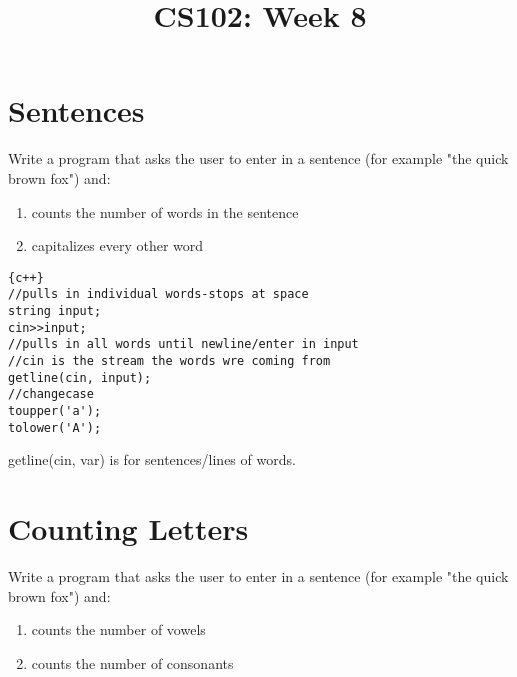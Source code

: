 \documentclass{article}
\begin{document}
\title{CS102: Week 8}

\maketitle

\section*{Sentences}
Write a program that asks the user to enter in a sentence (for example "the quick brown fox") and:
\begin{enumerate}
	\item counts the number of words in the sentence
	\item capitalizes every other word
\end{enumerate}

\begin{lstlisting}{c++}
//pulls in individual words-stops at space
string input;    
cin>>input;
//pulls in all words until newline/enter in input
//cin is the stream the words wre coming from
getline(cin, input);
//changecase
toupper('a');
tolower('A');
\end{lstlisting}
 getline(cin, var) is for sentences/lines of words.

\section*{Counting Letters}
Write a program that asks the user to enter in a sentence (for example "the quick brown fox") and:
\begin{enumerate}
	\item counts the number of vowels
	\item counts the number of consonants
\end{enumerate}
\end{document}
